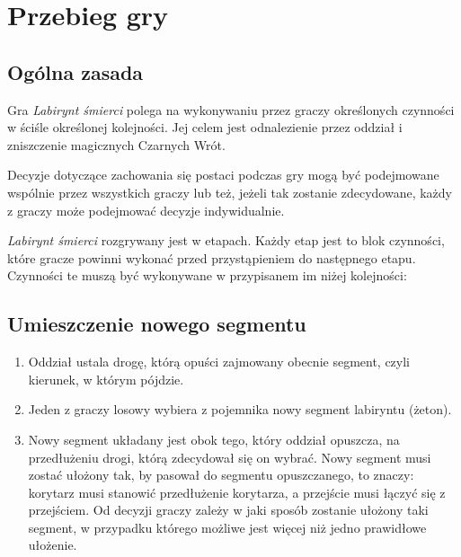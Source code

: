 \section{Przebieg gry}
\subsection{Ogólna zasada}
Gra \textit{Labirynt śmierci} polega na wykonywaniu przez graczy określonych czynności w ściśle określonej kolejności.
Jej celem jest odnalezienie przez oddział i zniszczenie magicznych Czarnych Wrót.

Decyzje dotyczące zachowania się postaci podczas gry mogą być podejmowane wspólnie przez wszystkich graczy lub też, jeżeli tak zostanie zdecydowane, każdy z graczy może podejmować decyzje indywidualnie.

\textit{Labirynt śmierci} rozgrywany jest w etapach.
Każdy etap jest to blok czynności, które gracze powinni wykonać przed przystąpieniem do następnego etapu.
Czynności te muszą być wykonywane w przypisanem im niżej kolejności:

\subsection{Umieszczenie nowego segmentu}
\begin{enumerate}
    \item
        Oddział ustala drogę, którą opuści zajmowany obecnie segment, czyli kierunek, w którym pójdzie.
    \item
        Jeden z graczy losowy wybiera z pojemnika nowy segment labiryntu (żeton).
    \item
        Nowy segment układany jest obok tego, który oddział opuszcza, na przedłużeniu drogi, którą zdecydował się on wybrać.
        Nowy segment musi zostać ułożony tak, by pasował do segmentu opuszczanego, to znaczy: korytarz musi stanowić przedłużenie korytarza, a przejście musi łączyć się z przejściem.
        Od decyzji graczy zależy w jaki sposób zostanie ułożony taki segment, w przypadku którego możliwe jest więcej niż jedno prawidłowe ułożenie.
\end{enumerate}

